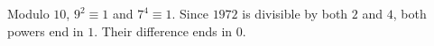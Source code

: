 Modulo $10$, $9^2\equiv1$ and $7^4\equiv1$. Since $1972$ is divisible by both $2$ and $4$, both powers end in $1$. Their difference ends in $\boxed0$.
